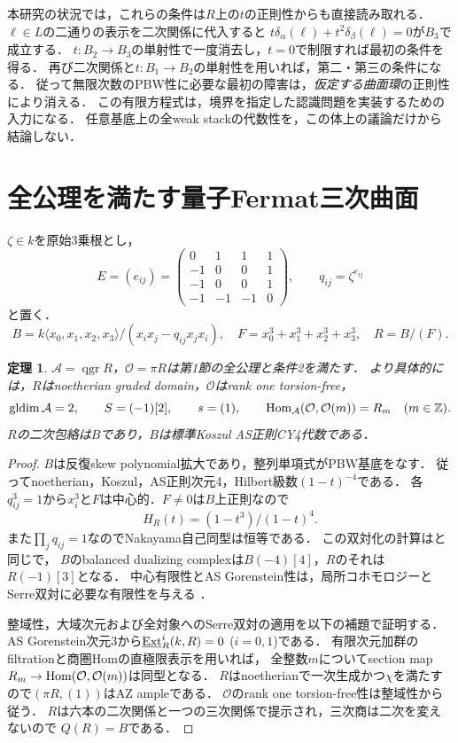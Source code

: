 \documentclass[11pt,a4paper]{ltjsarticle}
\newtheorem{theorem}{定理}[section]
\theoremstyle{definition}\newtheorem{definition}[theorem]{定義}
\newcommand{\OO}{\mathcal O}\newcommand{\cA}{\mathcal A}
\newcommand{\qgr}{\operatorname{qgr}}\newcommand{\Gr}{\operatorname{Gr}}
\begin{document}
本研究の状況では，これらの条件は$R$上の$t$の正則性からも直接読み取れる．
$\ell\in L$の二通りの表示を二次関係に代入すると
$t\delta_\alpha(\ell)+t^2\delta_\beta(\ell)=0$が$B_3$で成立する．
$t:B_2\to B_3$の単射性で一度消去し，$t=0$で制限すれば最初の条件を得る．
再び二次関係と$t:B_1\to B_2$の単射性を用いれば，第二・第三の条件になる．
従って無限次数のPBW性に必要な最初の障害は，\emph{仮定する曲面環}の正則性により消える．
この有限方程式は，境界を指定した認識問題を実装するための入力になる．
任意基底上の全weak stackの代数性を，この体上の議論だけから結論しない．

\section{全公理を満たす量子Fermat三次曲面}
$\zeta\in k$を原始3乗根とし，
\begin{equation}\label{eq:matrix}
 E=(e_{ij})=
 \begin{pmatrix}
 0&1&1&1\\-1&0&0&1\\-1&0&0&1\\-1&-1&-1&0
 \end{pmatrix},\qquad q_{ij}=\zeta^{e_{ij}}
\end{equation}
と置く．
\begin{equation}\label{eq:quantum}
 B=k\langle x_0,x_1,x_2,x_3\rangle/(x_ix_j-q_{ij}x_jx_i),\quad
 F=x_0^3+x_1^3+x_2^3+x_3^3,\quad R=B/(F).
\end{equation}

\begin{theorem}\label{thm:fermat}
$\cA=\qgr R$，$\OO=\pi R$は第1節の全公理と条件2を満たす．
より具体的には，$R$はnoetherian graded domain，$\OO$はrank one torsion-free，
\[
 \gldim\cA=2,\qquad S=(-1)[2],\qquad s=(1),\qquad
 \Hom_{\cA}(\OO,\OO(m))=R_m\quad(m\in\mathbb Z).
\]
$R$の二次包絡は$B$であり，$B$は標準Koszul AS正則CY4代数である．
\end{theorem}
\begin{proof}
$B$は反復skew polynomial拡大であり，整列単項式がPBW基底をなす．
従ってnoetherian，Koszul，AS正則次元4，Hilbert級数$(1-t)^{-4}$である．
各$q_{ij}^3=1$から$x_i^3$と$F$は中心的．$F\ne0$は$B$上正則なので
\[
 H_R(t)=(1-t^3)/(1-t)^4.
\]
また$\prod_jq_{ij}=1$なのでNakayama自己同型は恒等である．
この双対化の計算は\cite[Proposition 2.4]{Kanazawa}と同じで，
$B$のbalanced dualizing complexは$B(-4)[4]$，$R$のそれは$R(-1)[3]$となる．
中心有限性とAS Gorenstein性は，局所コホモロジーとSerre双対に必要な有限性を与える
\cite{YZ}．

整域性，大域次元および全対象へのSerre双対の適用を以下の補題で証明する．
AS Gorenstein次元3から$\underline{\operatorname{Ext}}^i_R(k,R)=0$ ($i=0,1$)である．
有限次元加群のfiltrationと商圏Homの直極限表示を用いれば，
全整数$m$についてsection map $R_m\to\Hom(\OO,\OO(m))$は同型となる．
$R$はnoetherianで一次生成かつ$\chi$を満たすので$(\pi R,(1))$はAZ ampleである．
$\OO$のrank one torsion-free性は整域性から従う．
$R$は六本の二次関係と一つの三次関係で提示され，三次商は二次を変えないので
$Q(R)=B$である．
\end{proof}
\end{document}
